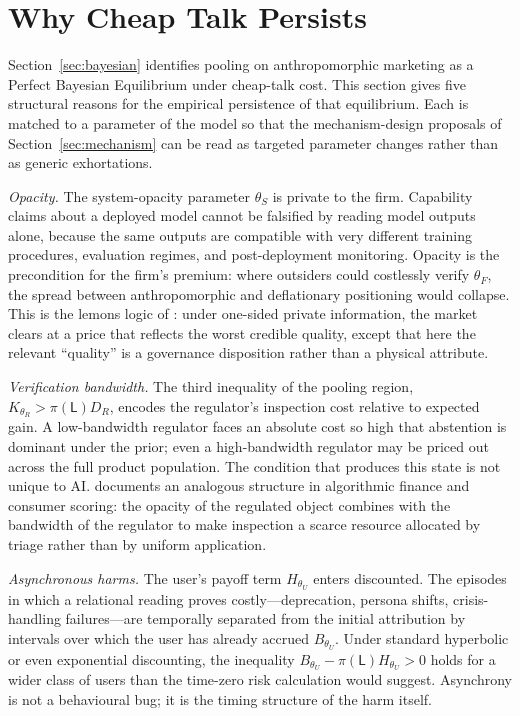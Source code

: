 \section{Why Cheap Talk Persists}
\label{sec:cheap-talk}

Section~\ref{sec:bayesian} identifies pooling on anthropomorphic marketing as a Perfect Bayesian Equilibrium under cheap-talk cost. This section gives five structural reasons for the empirical persistence of that equilibrium. Each is matched to a parameter of the model so that the mechanism-design proposals of Section~\ref{sec:mechanism} can be read as targeted parameter changes rather than as generic exhortations.

\emph{Opacity.} The system-opacity parameter $\theta_S$ is private to the firm. Capability claims about a deployed model cannot be falsified by reading model outputs alone, because the same outputs are compatible with very different training procedures, evaluation regimes, and post-deployment monitoring. Opacity is the precondition for the firm's premium: where outsiders could costlessly verify $\theta_F$, the spread between anthropomorphic and deflationary positioning would collapse. This is the lemons logic of \citet{akerlof1970}: under one-sided private information, the market clears at a price that reflects the worst credible quality, except that here the relevant ``quality'' is a governance disposition rather than a physical attribute.

\emph{Verification bandwidth.} The third inequality of the pooling region, $K_{\theta_R}>\pi(\mathsf{L})D_R$, encodes the regulator's inspection cost relative to expected gain. A low-bandwidth regulator faces an absolute cost so high that abstention is dominant under the prior; even a high-bandwidth regulator may be priced out across the full product population. The condition that produces this state is not unique to AI. \citet{pasquale2015} documents an analogous structure in algorithmic finance and consumer scoring: the opacity of the regulated object combines with the bandwidth of the regulator to make inspection a scarce resource allocated by triage rather than by uniform application.

\emph{Asynchronous harms.} The user's payoff term $H_{\theta_U}$ enters discounted. The episodes in which a relational reading proves costly---deprecation, persona shifts, crisis-handling failures---are temporally separated from the initial attribution by intervals over which the user has already accrued $B_{\theta_U}$. Under standard hyperbolic or even exponential discounting, the inequality $B_{\theta_U}-\pi(\mathsf{L})H_{\theta_U}>0$ holds for a wider class of users than the time-zero risk calculation would suggest. Asynchrony is not a behavioural bug; it is the timing structure of the harm itself.

